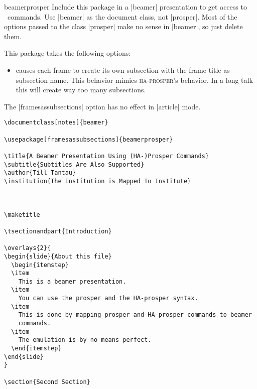 \begin{package}{{beamerprosper}}
  Include this package in a |beamer| presentation to get access to \prosper\ commands. Use |beamer| as the document class, not |prosper|. Most of the options passed to the class |prosper| make no sense in |beamer|, so just delete them.

  This package takes the following options:
  \begin{itemize}
  \item
     causes each frame to create its own subsection with the frame title as subsection name. This behavior mimics \textsc{ha}-\textsc{prosper}'s behavior. In a long talk this will create way too many subsections.
  \end{itemize}

  \articlenote
  The |framesassubsections| option has no effect in |article| mode.

  \example
\begin{verbatim}
\documentclass[notes]{beamer}

\usepackage[framesassubsections]{beamerprosper}

\title{A Beamer Presentation Using (HA-)Prosper Commands}
\subtitle{Subtitles Are Also Supported}
\author{Till Tantau}
\institution{The Institution is Mapped To Institute}



\maketitle

\tsectionandpart{Introduction}

\overlays{2}{
\begin{slide}{About this file}
  \begin{itemstep}
  \item
    This is a beamer presentation.
  \item
    You can use the prosper and the HA-prosper syntax.
  \item
    This is done by mapping prosper and HA-prosper commands to beamer
    commands.
  \item
    The emulation is by no means perfect.
  \end{itemstep}
\end{slide}
}

\section{Second Section}

\end{verbatim}
\end{package}
